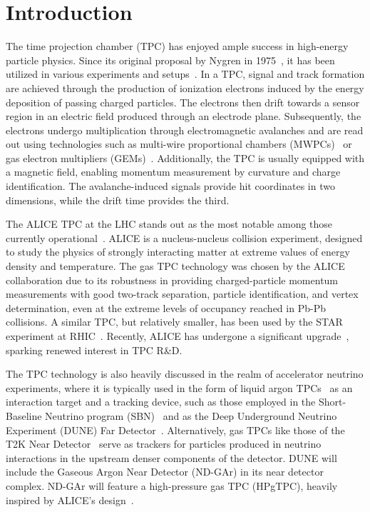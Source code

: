 \begin{savequote}[8cm]
\end{savequote}

\chapter{\label{ch:1-intro}Introduction} 
\minitoc
The time projection chamber (TPC) has enjoyed ample success in high-energy particle physics. Since its original proposal by Nygren in 1975~\cite{NygrenTPC}, it has been utilized in various experiments and setups~\cite{ATTIE200989,Hilke:2010zz}. In a TPC, signal and track formation are achieved through the production of ionization electrons induced by the energy deposition of passing charged particles. The electrons then drift towards a sensor region in an electric field produced through an electrode plane. Subsequently, the electrons undergo multiplication through electromagnetic avalanches and are read out using technologies such as multi-wire proportional chambers (MWPCs)~\cite{Charpak:1968kd} or gas electron multipliers (GEMs)~\cite{SAULI1997531}. Additionally, the TPC is usually equipped with a magnetic field, enabling  momentum measurement by curvature and charge identification. The avalanche-induced signals provide hit coordinates in two dimensions, while the drift time provides the third.

The ALICE TPC at the LHC stands out as the most notable among those currently operational~\cite{ALICE:2008ngc}. ALICE is a nucleus-nucleus collision experiment, designed to study the physics of strongly interacting matter at extreme values of energy density and temperature. The gas TPC technology was chosen by the ALICE collaboration due to its robustness in providing charged-particle momentum measurements with good two-track separation, particle identification, and vertex determination, even at the extreme levels of occupancy reached in Pb-Pb collisions. A similar TPC, but relatively smaller, has been used by the STAR experiment at RHIC~\cite{STAR:2002eio}. Recently, ALICE has undergone a significant upgrade~\cite{ALICE:2023udb}, sparking renewed interest in TPC R\&D. 

The TPC technology is also heavily discussed in the realm of accelerator neutrino experiments, where it is typically used in the form of liquid argon TPCs~\cite{Rubbia:1977zz} as an interaction target and a tracking device, such as those employed in the Short-Baseline Neutrino program (SBN)~\cite{Machado:2019oxb} and as the Deep Underground Neutrino Experiment (DUNE) Far Detector~\cite{DUNE:2020TDR4}. Alternatively, gas TPCs like those of the T2K Near Detector~\cite{T2KND280TPC:2010nnd} serve as trackers for particles produced in neutrino interactions in the upstream denser components of the detector. DUNE will include the Gaseous Argon Near Detector (ND-GAr) in its near detector complex. ND-GAr will feature a high-pressure gas TPC (HPgTPC), heavily inspired by ALICE's design~\cite{DUNE:2021NDCDR}.

